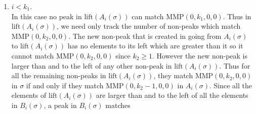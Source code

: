 \documentclass[
final,nomarks
]{dmtcs-episciences}
\newcommand{\MMP}{\mathrm{MMP}}
\begin{document}
\begin{enumerate}[{\bf Case }\bf 1.]
	\item \begin{math}i < k_1\end{math}.\\
	In this case no  peak in \begin{math}\mathrm{lift}(A_i(\sigma))\end{math} can match 
	\begin{math}\MMP(0,k_1,0,0)\end{math}.  Thus  in \begin{math}\mathrm{lift}(A_i(\sigma))\end{math}, we need 
	only track the number of non-peaks which match \begin{math}\MMP(0,k_2,0,0)\end{math}. The new non-peak 
	that is created in going from \begin{math}A_i(\sigma)\end{math} to \begin{math}\mathrm{lift}(A_i(\sigma))\end{math} has no 
	elements to its left which are greater than it so it cannot match 
	\begin{math}\MMP(0,k_2,0,0)\end{math} since \begin{math}k_2 \geq 1\end{math}.  However the new non-peak is larger than 
	and to the left of any other non-peak in \begin{math}\mathrm{lift}(A_i(\sigma))\end{math}.  Thus for 
	all the remaining non-peaks in \begin{math}\mathrm{lift}(A_i(\sigma))\end{math}, they match 
	\begin{math}\MMP(0,k_2,0,0)\end{math} in \begin{math}\sigma\end{math} if and only if they match \begin{math}\MMP(0,k_2-1,0,0)\end{math} in 
	\begin{math}A_i(\sigma)\end{math}. Since all the elements of \begin{math}\mathrm{lift}(A_i(\sigma))\end{math} are larger than 
	and to the left of all the elements in \begin{math}B_i(\sigma)\end{math}, a peak in \begin{math}B_i(\sigma)\end{math} matches 

\end{enumerate}
\end{document}
